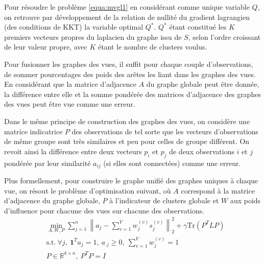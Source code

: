 		 Pour résoudre le problème \ref{equa:mvgl1} en considérant comme unique variable $Q$, on retrouve par développement de la relation de nullité du gradient lagrangien (des conditions de KKT) la variable optimal $Q^*$. $Q^*$ étant constitué les $K$ premiers vecteurs propres du laplacien du graphe issu de $S$, selon l'ordre croissant de leur valeur propre, avec $K$ étant le nombre de clusters voulus. %

  	 
   	 Pour fusionner les graphes des vues, il suffit pour chaque couple d'observations, de sommer pourcentages des poids des arêtes les liant dans les graphes des vues.
   	 En considérant que la matrice d'adjacence $A$ du graphe globale peut être donnée, la différence entre elle et la somme pondérée des matrices d'adjacence des graphes des vues peut être vue comme une erreur.
  	 
   	 Dans le même principe de construction des graphes des vues, on considère une matrice indicatrice $P$ des observations de tel sorte que les vecteurs d'observations de même groupe sont très similaires et peu pour celles de groupe différent. On revoit ainsi la différence entre deux vecteurs $p_i$ et $p_j$ de deux observations $i$ et $j$ pondérée par leur similarité $a_{ij}$ (si elles sont connectées) comme une erreur.

  	  Plus formellement, pour construire le graphe unifié des graphes uniques à chaque vue, on résout le problème d'optimisation suivant, où
  	  $A$ correspond à la matrice d'adjacence du graphe globale,
        $P$ à l'indicateur de clusters globale et
  	  $W$ aux poids d'influence pour chacune des vues sur chacune des observations.
        \begin{equation}
			\begin{aligned}
				& \min_{A,W,P} \sum_{j=1}^n {\left\| a_{j} - \sum_{v=1}^V w_{j}^{(v)}s_{j}^{(v)}\right\|}_2^2 + \gamma \text{Tr}(P^TLP)
     		   \\ & \text{s.t.}\ \forall j,\ \textbf{1}^Ta_{j} = 1,\ a_{.j}\geq0,\ \sum_{v=1}^V w_{j}^{(v)} = 1
     		   \\ & P \in \mathbb{R}^{k \times n} ,\ P^TP = I
     	   \end{aligned}
			\label{equa:mvgl2}
  	  \end{equation}
      
